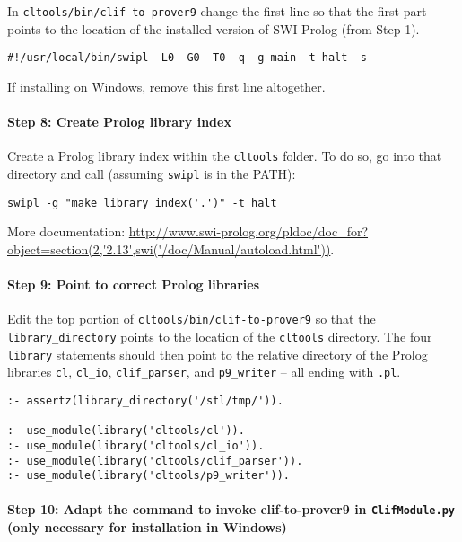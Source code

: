 \documentclass{article}
\begin{document}
In \texttt{cltools/bin/clif-to-prover9} change the first line so that the first part points to the location of the installed version of SWI Prolog (from Step 1). 

\begin{verbatim}
#!/usr/local/bin/swipl -L0 -G0 -T0 -q -g main -t halt -s
\end{verbatim}

If installing on Windows, remove this first line altogether.

\paragraph{Step 8: Create Prolog library index}

Create a Prolog library index within the \texttt{cltools} folder. To do so, go into that directory and call (assuming \texttt{swipl} is in the PATH):
\begin{verbatim}
swipl -g "make_library_index('.')" -t halt
\end{verbatim}
More documentation: \url{http://www.swi-prolog.org/pldoc/doc_for?object=section(2,'2.13',swi('/doc/Manual/autoload.html'))}.

\paragraph{Step 9: Point to correct Prolog libraries}

Edit the top portion of \texttt{cltools/bin/\allowbreak clif-to-prover9} so that the \texttt{library\_directory} points to the location of the \texttt{cltools} directory.  The four \texttt{library} statements should then point to the relative directory of the Prolog libraries \texttt{cl}, \texttt{cl\_io}, \texttt{clif\_parser}, and \texttt{p9\_writer} -- all ending with \texttt{.pl}.

\begin{verbatim}
:- assertz(library_directory('/stl/tmp/')).

:- use_module(library('cltools/cl')).
:- use_module(library('cltools/cl_io')).
:- use_module(library('cltools/clif_parser')).
:- use_module(library('cltools/p9_writer')).
\end{verbatim}


\paragraph{Step 10: Adapt the command to invoke clif-to-prover9 in \texttt{ClifModule.py} (only necessary for installation in Windows)}
\end{document}
